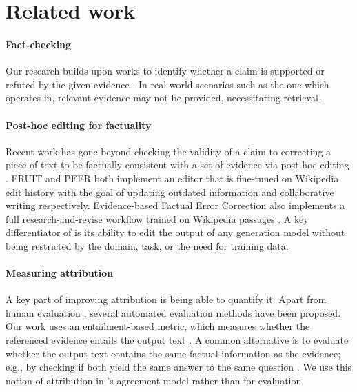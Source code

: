 \section{Related work}\label{section:related}

\paragraph{Fact-checking}
Our research builds upon works to identify whether a claim is supported or refuted by the given evidence \cite{thorne2018fever, wang2017liar, karadzhov2017fully, augenstein2019multifc, wadden2020fact}. In real-world scenarios such as the one which \approach{} operates in, relevant evidence may not be provided, necessitating retrieval \cite{fan2020generating,piktus2021web}.

\paragraph{Post-hoc editing for factuality}
Recent work has gone beyond checking the validity of a claim to correcting a piece of text to be factually consistent with a set of evidence via post-hoc editing \cite{shah2020automatic,thorne2021evidence,schuster2021get, Balachandran2022CorrectingDF, Cao2020FactualEC, Iso2020FactbasedTE}.
FRUIT \cite{LoganIV2022FRUIT} and PEER \cite{Schick2022PEER} both implement an editor that is fine-tuned on Wikipedia edit history with the goal of updating outdated information and collaborative writing respectively.
Evidence-based Factual Error Correction \cite[EFEC;][]{thorne2021evidence} also implements a full research-and-revise workflow trained on Wikipedia passages \cite{thorne2018fever}.
A key differentiator of \approach{} is its ability to edit the output of any generation model without being restricted by the domain, task, or the need for training data.

\paragraph{Measuring attribution}
A key part of improving attribution is being able to quantify it.
Apart from human evaluation \cite{Rashkin2021AIS},
several automated evaluation methods have been proposed.
Our work uses an entailment-based metric,
which measures whether the referenced evidence entails the output text \cite{Bohnet2022AttributedQA, Kryscinski2020EvaluatingTF,Goyal2021AnnotatingAM}.
A common alternative is to evaluate whether the output text contains the same factual information as the evidence; e.g., by checking if both yield the same answer to the same question \cite{Wang2020AskingAA}. We use this notion of attribution in \approach{}'s agreement model rather than for evaluation. 

